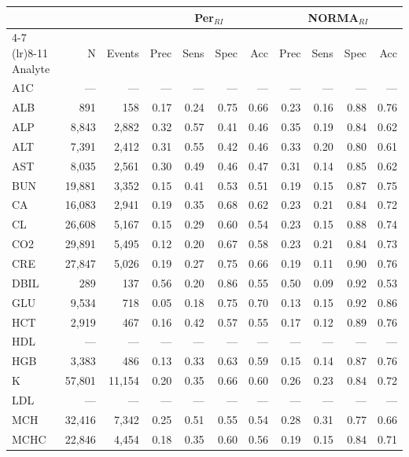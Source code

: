 \begin{table}[ht]
\centering
\footnotesize
\begin{tabular}{lrrrrrrrrrr}
\toprule
 & &  & \multicolumn{4}{c}{Per$_{RI}$} & \multicolumn{4}{c}{NORMA$_{RI}$} \\
\cmidrule(lr){4-7} \cmidrule(lr){8-11}
Analyte & N & Events & Prec & Sens & Spec & Acc & Prec & Sens & Spec & Acc \\
\midrule
A1C & --- & --- & --- & --- & --- & --- & --- & --- & --- & --- \\
ALB & 891 & 158 & 0.17 & 0.24 & 0.75 & 0.66 & 0.23 & 0.16 & 0.88 & 0.76 \\
ALP & 8,843 & 2,882 & 0.32 & 0.57 & 0.41 & 0.46 & 0.35 & 0.19 & 0.84 & 0.62 \\
ALT & 7,391 & 2,412 & 0.31 & 0.55 & 0.42 & 0.46 & 0.33 & 0.20 & 0.80 & 0.61 \\
AST & 8,035 & 2,561 & 0.30 & 0.49 & 0.46 & 0.47 & 0.31 & 0.14 & 0.85 & 0.62 \\
BUN & 19,881 & 3,352 & 0.15 & 0.41 & 0.53 & 0.51 & 0.19 & 0.15 & 0.87 & 0.75 \\
CA & 16,083 & 2,941 & 0.19 & 0.35 & 0.68 & 0.62 & 0.23 & 0.21 & 0.84 & 0.72 \\
CL & 26,608 & 5,167 & 0.15 & 0.29 & 0.60 & 0.54 & 0.23 & 0.15 & 0.88 & 0.74 \\
CO2 & 29,891 & 5,495 & 0.12 & 0.20 & 0.67 & 0.58 & 0.23 & 0.21 & 0.84 & 0.73 \\
CRE & 27,847 & 5,026 & 0.19 & 0.27 & 0.75 & 0.66 & 0.19 & 0.11 & 0.90 & 0.76 \\
DBIL & 289 & 137 & 0.56 & 0.20 & 0.86 & 0.55 & 0.50 & 0.09 & 0.92 & 0.53 \\
GLU & 9,534 & 718 & 0.05 & 0.18 & 0.75 & 0.70 & 0.13 & 0.15 & 0.92 & 0.86 \\
HCT & 2,919 & 467 & 0.16 & 0.42 & 0.57 & 0.55 & 0.17 & 0.12 & 0.89 & 0.76 \\
HDL & --- & --- & --- & --- & --- & --- & --- & --- & --- & --- \\
HGB & 3,383 & 486 & 0.13 & 0.33 & 0.63 & 0.59 & 0.15 & 0.14 & 0.87 & 0.76 \\
K & 57,801 & 11,154 & 0.20 & 0.35 & 0.66 & 0.60 & 0.26 & 0.23 & 0.84 & 0.72 \\
LDL & --- & --- & --- & --- & --- & --- & --- & --- & --- & --- \\
MCH & 32,416 & 7,342 & 0.25 & 0.51 & 0.55 & 0.54 & 0.28 & 0.31 & 0.77 & 0.66 \\
MCHC & 22,846 & 4,454 & 0.18 & 0.35 & 0.60 & 0.56 & 0.19 & 0.15 & 0.84 & 0.71 \\

\end{tabular}
\end{table}
